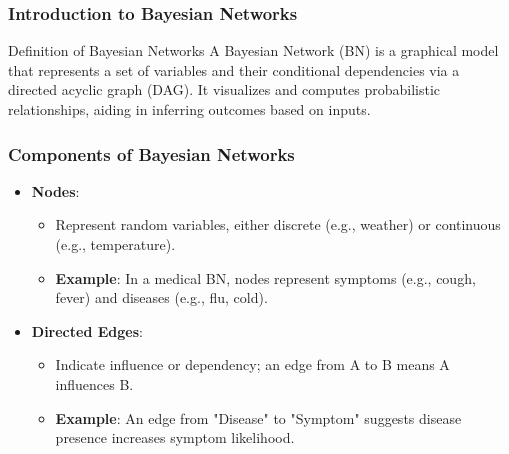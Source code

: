 \documentclass[aspectratio=169]{beamer}
\begin{document}
\begin{frame}[fragile]
    \frametitle{Introduction to Bayesian Networks}
    \begin{block}{Definition of Bayesian Networks}
        A Bayesian Network (BN) is a graphical model that represents a set of variables and their conditional dependencies via a directed acyclic graph (DAG).
        It visualizes and computes probabilistic relationships, aiding in inferring outcomes based on inputs.
    \end{block}
\end{frame}

\begin{frame}[fragile]
    \frametitle{Components of Bayesian Networks}
    \begin{itemize}
        \item \textbf{Nodes}:
            \begin{itemize}
                \item Represent random variables, either discrete (e.g., weather) or continuous (e.g., temperature).
                \item \textbf{Example}: In a medical BN, nodes represent symptoms (e.g., cough, fever) and diseases (e.g., flu, cold).
            \end{itemize}
        \item \textbf{Directed Edges}:
            \begin{itemize}
                \item Indicate influence or dependency; an edge from A to B means A influences B.
                \item \textbf{Example}: An edge from "Disease" to "Symptom" suggests disease presence increases symptom likelihood.
            \end{itemize}
    \end{itemize}
\end{frame}
\end{document}
